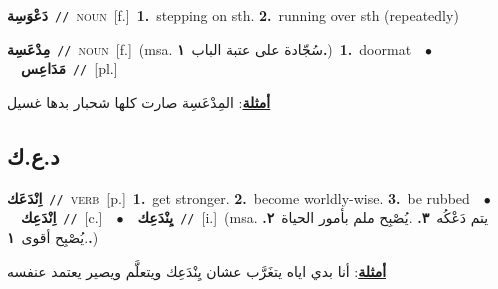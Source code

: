 \documentclass[10pt,a4paper,twoside]{article} %
\begin{document}
\begin{multicols}{2}
{\setlength\topsep{0pt}\textbf{\foreignlanguage{arabic}{دَعْوَسِة}}\ {\color{gray}\texttt{//}\color{black}}\ \textsc{noun}\ [f.]\ \textbf{1.}~stepping on sth.  \textbf{2.}~running over sth (repeatedly)\ } \vspace{2mm}

{\setlength\topsep{0pt}\textbf{\foreignlanguage{arabic}{مِدْعَسِة}}\ {\color{gray}\texttt{//}\color{black}}\ \textsc{noun}\ [f.]\ \color{gray}(msa. \foreignlanguage{arabic}{سُجّادة على عتبة الباب}~\foreignlanguage{arabic}{\textbf{١.}})\color{black}\ \textbf{1.}~doormat\ \ $\bullet$\ \ \setlength\topsep{0pt}\textbf{\foreignlanguage{arabic}{مَدَاعِس}}\ {\color{gray}\texttt{//}\color{black}}\ [pl.]\  \begin{flushright}\color{gray}\foreignlanguage{arabic}{\textbf{\underline{\foreignlanguage{arabic}{أمثلة}}}: المِدْعَسِة صارت كلها شحبار بدها غسيل}\end{flushright}\color{black}} \vspace{2mm}

\vspace{-3mm}
\subsection*{\color{blue}\foreignlanguage{arabic}{د.ع.ك}\color{blue}{}} 

{\setlength\topsep{0pt}\textbf{\foreignlanguage{arabic}{اِنْدَعَك}}\ {\color{gray}\texttt{//}\color{black}}\ \textsc{verb}\ [p.]\ \textbf{1.}~get stronger.  \textbf{2.}~become worldly-wise.  \textbf{3.}~be rubbed\ \ $\bullet$\ \ \setlength\topsep{0pt}\textbf{\foreignlanguage{arabic}{اِنْدَعِك}}\ {\color{gray}\texttt{//}\color{black}}\ [c.]\ \ $\bullet$\ \ \setlength\topsep{0pt}\textbf{\foreignlanguage{arabic}{يِنْدَعِك}}\ {\color{gray}\texttt{//}\color{black}}\ [i.]\ \color{gray}(msa. \foreignlanguage{arabic}{يتم دَعْكُه}~\foreignlanguage{arabic}{\textbf{٣.}}  .\foreignlanguage{arabic}{يُصْبِح ملم بأمور الحياة}~\foreignlanguage{arabic}{\textbf{٢.}}  .\foreignlanguage{arabic}{يُصْبِح أقوى}~\foreignlanguage{arabic}{\textbf{١.}})\color{black}\  \begin{flushright}\color{gray}\foreignlanguage{arabic}{\textbf{\underline{\foreignlanguage{arabic}{أمثلة}}}: أنا بدي اياه يتغَرَّب عشان يِنْدَعِك  ويتعلَّم ويصير يعتمد عنفسه}\end{flushright}\color{black}} \vspace{2mm}


\end{multicols}
\end{document}
